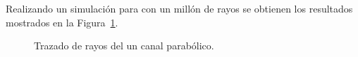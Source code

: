 Realizando un simulación para con un millón de rayos se obtienen los resultados mostrados en la Figura~\ref{fig:canal}.

\begin{figure}[ht]
  \centering
  \caption{\label{fig:canal} Trazado de rayos del un canal parabólico.}
\end{figure}

